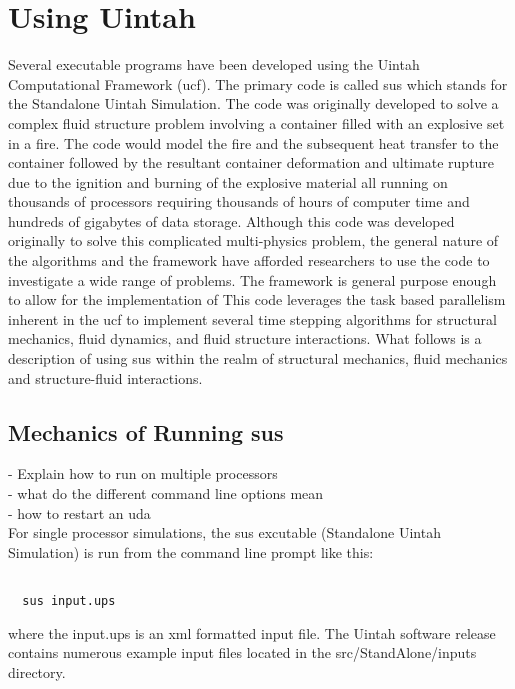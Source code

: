 \section{Using Uintah} \label{Sec:UCF}

Several executable programs have been developed using the Uintah
Computational Framework (ucf).  The primary code is called sus which
stands for the Standalone Uintah Simulation.  The code was originally
developed to solve a complex fluid structure problem involving a
container filled with an explosive set in a fire.  The code would
model the fire and the subsequent heat transfer to the container
followed by the resultant container deformation and ultimate rupture
due to the ignition and burning of the explosive material all running
on thousands of processors requiring thousands of hours of computer
time and hundreds of gigabytes of data storage.  Although this code
was developed originally to solve this complicated multi-physics
problem, the general nature of the algorithms and the framework have
afforded researchers to use the code to investigate a wide range of
problems.  The framework is general purpose enough to allow for the
implementation of This code leverages the task based parallelism
inherent in the ucf to implement several time stepping algorithms for
structural mechanics, fluid dynamics, and fluid structure
interactions.  What follows is a description of using sus within the
realm of structural mechanics, fluid mechanics and structure-fluid
interactions.



\subsection{Mechanics of Running sus}
 - Explain how to run on multiple processors\\
 - what do the different command line options mean\\
 - how to restart an uda\\

For single processor simulations, the sus excutable (Standalone Uintah Simulation) is run from the command line prompt like this:

\begin{Verbatim}
  
  sus input.ups

\end{Verbatim}

where the input.ups is an xml formatted input file.  The Uintah
software release contains numerous example input files located in the
src/StandAlone/inputs directory.

